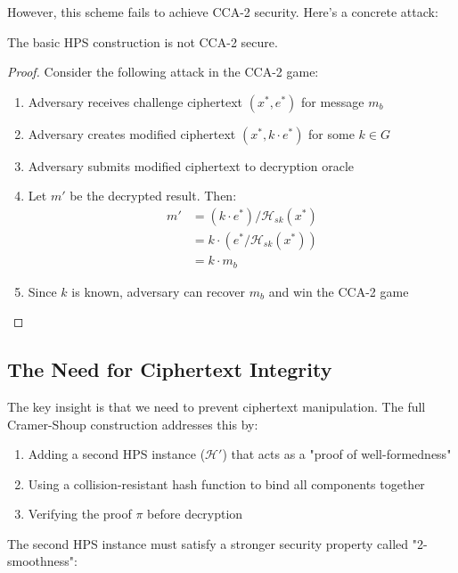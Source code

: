 However, this scheme fails to achieve CCA-2 security. Here's a concrete attack:

\begin{theorem}
The basic HPS construction is not CCA-2 secure.
\end{theorem}

\begin{proof}
Consider the following attack in the CCA-2 game:
\begin{enumerate}
    \item Adversary receives challenge ciphertext $(x^*, e^*)$ for message $m_b$
    \item Adversary creates modified ciphertext $(x^*, k \cdot e^*)$ for some $k \in G$
    \item Adversary submits modified ciphertext to decryption oracle
    \item Let $m'$ be the decrypted result. Then:
    \begin{align*}
        m' &= (k \cdot e^*)/\mathcal{H}_{sk}(x^*) \\
        &= k \cdot (e^*/\mathcal{H}_{sk}(x^*)) \\
        &= k \cdot m_b
    \end{align*}
    \item Since $k$ is known, adversary can recover $m_b$ and win the CCA-2 game
\end{enumerate}
\end{proof}

\subsection{The Need for Ciphertext Integrity}

The key insight is that we need to prevent ciphertext manipulation. The full Cramer-Shoup construction addresses this by:

\begin{enumerate}
    \item Adding a second HPS instance ($\mathcal{H}'$) that acts as a "proof of well-formedness"
    \item Using a collision-resistant hash function to bind all components together
    \item Verifying the proof $\pi$ before decryption
\end{enumerate}

The second HPS instance must satisfy a stronger security property called "2-smoothness":

